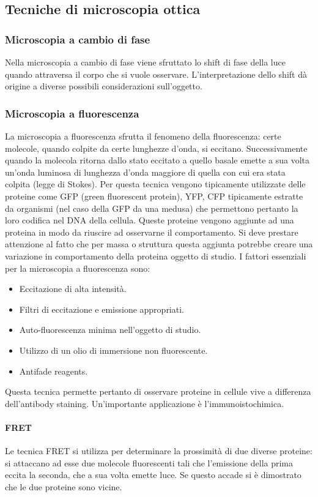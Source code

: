 \subsection{Tecniche di microscopia ottica}
\subsubsection{Microscopia a cambio di fase}
Nella microscopia a cambio di fase viene sfruttato lo shift di fase della luce quando attraversa il corpo che si vuole osservare. L'interpretazione dello 
shift d\`a origine a diverse possibili considerazioni sull'oggetto.
\subsubsection{Microscopia a fluorescenza}
La microscopia a fluorescenza sfrutta il fenomeno della fluorescenza: certe molecole, quando colpite da certe lunghezze d'onda, si eccitano. Successivamente
quando la molecola ritorna dallo stato eccitato a quello basale emette a sua volta un'onda luminosa di lunghezza d'onda maggiore di quella con cui era
stata colpita (legge di Stokes). Per questa tecnica vengono tipicamente utilizzate delle proteine come GFP (green fluorescent protein), YFP, CFP tipicamente
estratte da organismi (nel caso della GFP da una medusa) che permettono pertanto la loro codifica nel DNA della cellula. Queste proteine vengono aggiunte ad
una proteina in modo da riuscire ad osservarne il comportamento. Si deve prestare attenzione al fatto che per massa o struttura questa aggiunta potrebbe 
creare una variazione in comportamento della proteina oggetto di studio. I fattori essenziali per la microscopia a fluorescenza sono:
\begin{itemize}
\item Eccitazione di alta intensit\`a.
\item Filtri di eccitazione e emissione appropriati.
\item Auto-fluorescenza minima nell'oggetto di studio.
\item Utilizzo di un olio di immersione non fluorescente. 
\item Antifade reagents.
\end{itemize}
Questa tecnica permette pertanto di osservare proteine in cellule vive a differenza dell'antibody staining. Un'importante applicazione \`e 
l'immunoistochimica.
\paragraph{FRET}
Le tecnica FRET si utilizza per determinare la prossimit\`a di due diverse proteine: si attaccano ad esse due molecole fluorescenti tali che l'emissione 
della prima eccita la seconda, che a sua volta emette luce. Se questo accade si \`e dimostrato che le due proteine sono vicine.
